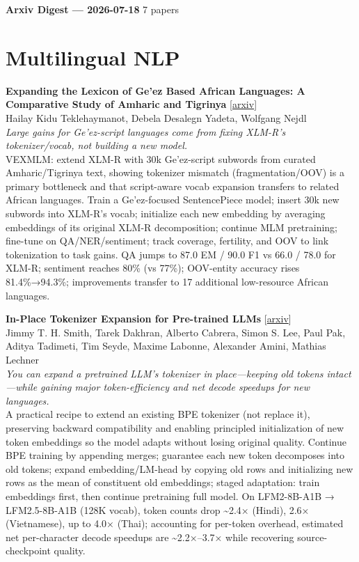 \documentclass[12pt,letterpaper]{article}
\begin{document}
{\footnotesize\textbf{Arxiv Digest --- 2026-07-18} \hfill 7 papers}

\smallskip

\section*{Multilingual NLP}

{\small\textbf{Expanding the Lexicon of Ge'ez Based African Languages: A Comparative Study of Amharic and Tigrinya}} {\scriptsize[\href{https://arxiv.org/abs/2607.15209}{arxiv}]}\\
{\scriptsize Hailay Kidu Teklehaymanot, Debela Desalegn Yadeta, Wolfgang Nejdl}\\

{\small\textit{Large gains for Ge'ez-script languages come from fixing XLM-R's tokenizer/vocab, not building a new model.}}\\[1pt]
{\footnotesize VEXMLM: extend XLM-R with 30k Ge'ez-script subwords from curated Amharic/Tigrinya text, showing tokenizer mismatch (fragmentation/OOV) is a primary bottleneck and that script-aware vocab expansion transfers to related African languages. Train a Ge'ez-focused SentencePiece model; insert 30k new subwords into XLM-R's vocab; initialize each new embedding by averaging embeddings of its original XLM-R decomposition; continue MLM pretraining; fine-tune on QA/NER/sentiment; track coverage, fertility, and OOV to link tokenization to task gains. QA jumps to 87.0 EM / 90.0 F1 vs 66.0 / 78.0 for XLM-R; sentiment reaches 80\% (vs 77\%); OOV-entity accuracy rises 81.4\%→94.3\%; improvements transfer to 17 additional low-resource African languages.}

\medskip

{\small\textbf{In-Place Tokenizer Expansion for Pre-trained LLMs}} {\scriptsize[\href{https://arxiv.org/abs/2607.15232}{arxiv}]}\\
{\scriptsize Jimmy T. H. Smith, Tarek Dakhran, Alberto Cabrera, Simon S. Lee, Paul Pak, Aditya Tadimeti, Tim Seyde, Maxime Labonne, Alexander Amini, Mathias Lechner}\\

{\small\textit{You can expand a pretrained LLM's tokenizer in place---keeping old tokens intact---while gaining major token-efficiency and net decode speedups for new languages.}}\\[1pt]
{\footnotesize A practical recipe to extend an existing BPE tokenizer (not replace it), preserving backward compatibility and enabling principled initialization of new token embeddings so the model adapts without losing original quality. Continue BPE training by appending merges; guarantee each new token decomposes into old tokens; expand embedding/LM-head by copying old rows and initializing new rows as the mean of constituent old embeddings; staged adaptation: train embeddings first, then continue pretraining full model. On LFM2-8B-A1B → LFM2.5-8B-A1B (128K vocab), token counts drop \textasciitilde{}2.4× (Hindi), 2.6× (Vietnamese), up to 4.0× (Thai); accounting for per-token overhead, estimated net per-character decode speedups are \textasciitilde{}2.2×--3.7× while recovering source-checkpoint quality.}
\end{document}
